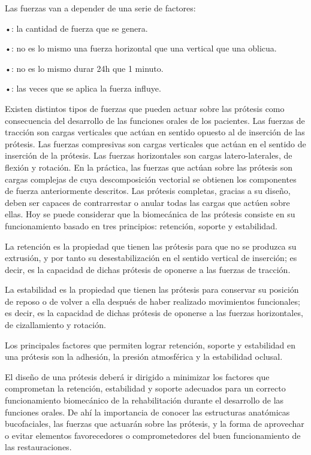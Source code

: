 \documentclass{article}
\begin{document}
Las fuerzas van a depender de una serie de factores:

•: la cantidad de fuerza que se genera.

•: no es lo mismo una fuerza horizontal que una vertical que una oblicua.

•: no es lo mismo durar 24h que 1 minuto.

•: las veces que se aplica la fuerza influye.

Existen distintos tipos de fuerzas que pueden actuar sobre las prótesis como consecuencia del desarrollo de las funciones orales de los pacientes. Las fuerzas de tracción son cargas verticales que actúan en sentido opuesto al de inserción de las prótesis. Las fuerzas compresivas son cargas verticales que actúan en el sentido de inserción de la prótesis. Las fuerzas horizontales son cargas latero-laterales, de flexión y rotación. En la práctica, las fuerzas que actúan sobre las prótesis son cargas complejas de cuya descomposición vectorial se obtienen los componentes de fuerza anteriormente descritos. Las prótesis completas, gracias a su diseño, deben ser capaces de contrarrestar o anular todas las cargas que actúen sobre ellas. Hoy se puede considerar que la biomecánica de las prótesis consiste en su funcionamiento basado en tres principios: retención, soporte y estabilidad.

La retención es la propiedad que tienen las prótesis para que no se produzca su extrusión, y por tanto su desestabilización en el sentido vertical de inserción; es decir, es la capacidad de dichas prótesis de oponerse a las fuerzas de tracción.

La estabilidad es la propiedad que tienen las prótesis para conservar su posición de reposo o de volver a ella después de haber realizado movimientos funcionales; es decir, es la capacidad de dichas prótesis de oponerse a las fuerzas horizontales, de cizallamiento y rotación.

Los principales factores que permiten lograr retención, soporte y estabilidad en una prótesis son la adhesión, la presión atmosférica y la estabilidad oclusal.

El diseño de una prótesis deberá ir dirigido a minimizar los factores que comprometan la retención, estabilidad y soporte adecuados para un correcto funcionamiento biomecánico de la rehabilitación durante el desarrollo de las funciones orales. De ahí la importancia de conocer las estructuras anatómicas bucofaciales, las fuerzas que actuarán sobre las prótesis, y la forma de aprovechar o evitar elementos favorecedores o comprometedores del buen funcionamiento de las restauraciones.
\end{document}
